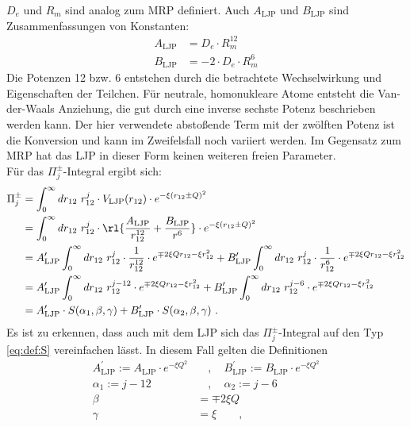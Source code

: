 $D_e$ und $R_m$ sind analog zum MRP definiert. Auch $A_\text{LJP}$ und 
$B_\text{LJP}$ sind Zusammenfassungen von Konstanten:
%
\begin{align}
A_\text{LJP} &= D_e\cdot R_m^{12} \\
B_\text{LJP} &= -2\cdot D_e \cdot R_m^6 
\end{align}
%
Die Potenzen 12 bzw. 6 entstehen durch die betrachtete Wechselwirkung und 
Eigenschaften der Teilchen. Für neutrale, homonukleare Atome entsteht die 
Van-der-Waals Anziehung, die gut durch eine inverse sechste 
Potenz beschrieben 
werden kann. Der hier verwendete abstoßende Term mit der 
zwölften Potenz ist die
Konversion und kann im Zweifelsfall noch variiert werden. Im Gegensatz zum MRP 
hat das LJP in dieser Form keinen weiteren freien Parameter.\\
Für das $\Pi^\pm_j$-Integral ergibt sich:
%
\begin{align}
\Pi_j^\pm & =\int_{0}^{\infty}dr_{12}\ r_{12}^j \cdot V_\text{LJP}(r_{12}) \cdot
             e^{-\xi (r_{12} \pm Q)^2}\\\nonumber
          & = \int_{0}^{\infty}dr_{12}\ r_{12}^j \cdot 
          \rl{\frac{A_\text{LJP}}{r_{12}^{12}}+\frac{B_\text{LJP}}{r^6}}\cdot
          e^{-\xi (r_{12} \pm Q)^2}\\\nonumber
& = A^\prime_\text{LJP}\int_{0}^{\infty}dr_{12}\ r_{12}^j \cdot 
\frac{1}{r_{12}^{12}}\cdot e^{\mp 2\xi Q r_{12} -\xi r_{12}^2}+ 
B^\prime_\text{LJP}\int_{0}^{\infty}dr_{12}\ r_{12}^j 
\cdot\frac{1}{r_{12}^6}\cdot e^{\mp 2\xi Q r_{12} -\xi 
r_{12}^2}\\\nonumber
&=A^\prime_\text{LJP}\int_{0}^{\infty}dr_{12}\ r_{12}^{j-12}\cdot e^{\mp 2\xi Q 
r_{12} -\xi r_{12}^2}+ 
B^\prime_\text{LJP}\int_{0}^{\infty}dr_{12}\ r_{12}^{j-6}\cdot e^{\mp 2\xi Q 
r_{12} -\xi r_{12}^2}\\\label{eq:PI_LJP}
&=A^\prime_\text{LJP}\cdot 
S(\alpha_1,\beta,\gamma)+B^\prime_\text{LJP}\cdot 
S(\alpha_2,\beta,\gamma)\ .
\end{align}
%
Es ist zu erkennen, dass auch mit dem LJP  sich das $\Pi^\pm_j$-Integral auf 
den Typ \ref{eq:def:S} vereinfachen lässt. In diesem Fall gelten die 
Definitionen 
%
\begin{align}\nonumber
A^\prime_\text{LJP}:=A_\text{LJP}\cdot e^{-\xi Q^2} &\quad,\quad 
B^\prime_\text{LJP}:=B_\text{LJP}\cdot e^{-\xi Q^2} \\\nonumber
\alpha_1:=j-12 &\quad,\quad \alpha_2:=j-6 \\\nonumber
\beta&=\mp 2\xi Q\\
\gamma &= \xi \qquad,
\end{align}
